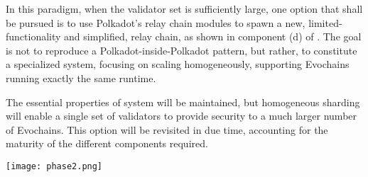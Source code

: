 In this paradigm, when the validator set is sufficiently large,
one option that shall be pursued is
to use Polkadot's relay chain modules to spawn a new, limited-functionality and
simplified, relay chain, as shown in component (d) of .
The goal is not to reproduce a Polkadot-inside-Polkadot pattern, but rather,
to constitute a specialized system, focusing on scaling homogeneously,
supporting Evochains running exactly the same runtime.  

The essential properties of system will be maintained, but homogeneous sharding
will enable a single set of validators to provide security to a much larger
number of Evochains. This option will be revisited in due time,
accounting for the maturity of the different components required.

\begin{Figure}
    \medskip
    \texttt{[image: phase2.png]}
    \medskip
    \label{fig:phase2}
\end{Figure}







